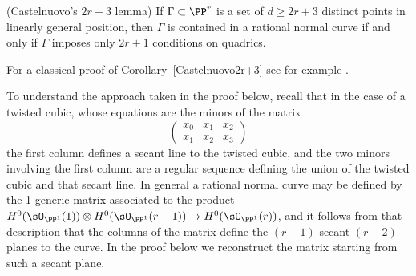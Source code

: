 \begin{corollary}(Castelnuovo's $2r+3$ lemma)\label{Castelnuovo2r+3}
If $\Gamma\subset \PP^r$ is a set of $d \geq 2r+3$ distinct points in linearly general position, then
$\Gamma$ is contained in a rational normal curve if and only if $\Gamma$ imposes only $2r+1$
conditions on quadrics. 
\end{corollary}
 For a classical proof of Corollary~\ref{Castelnuovo2r+3} see for example \cite[p. 531]{Griffiths-Harris1978}.

 To understand the approach taken in the proof below, recall that in the case of a twisted
 cubic, whose equations are the minors of the matrix
 $$
\begin{pmatrix}
 x_0&x_1&x_2\\
 x_1&x_2&x_3
\end{pmatrix}
 $$
the first column defines a secant line to the twisted cubic, and the two minors involving the first column are a regular sequence defining the union of the twisted cubic and that secant line.
In general a rational normal curve may be defined by the 1-generic matrix  associated to the product $H^0(\sO_{\PP^1}(1)) \otimes H^0(\sO_{\PP^1}(r-1)) \to H^0(\sO_{\PP^1}(r))$,
and it follows from that description that the columns of the matrix define the $(r-1)$-secant $(r-2)$-planes to the curve. In the proof below we reconstruct the matrix starting from such a secant plane.

